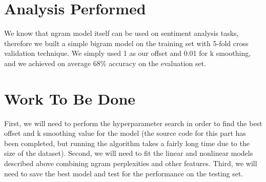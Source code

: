 \documentclass[a4paper]{article}
\begin{document}
\section{Analysis Performed}
\begin{flushleft}
We know that ngram model itself can be used on sentiment analysis tasks, therefore we built a simple bigram model on the training set with 5-fold cross validation technique. We simply used 1 as our offset and 0.01 for k smoothing, and we achieved on average 68\% accuracy on the evaluation set. 
\end{flushleft}
\section{Work To Be Done}
\begin{flushleft}
First, we will need to perform the hyperparameter search in order to find the best offset and k smoothing value for the model (the source code for this part has been completed, but running the algorithm takes a fairly long time due to the size of the dataset). Second, we will need to fit the linear and nonlinear models described above combining ngram perplexities and other features. Third, we will need to save the best model and test for the performance on the testing set. 
\end{flushleft}
\end{document}

